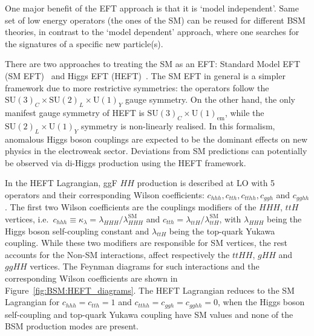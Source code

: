 One major benefit of the EFT approach is that it is `model independent'.
Same set of low energy operators (the ones of the SM) can be reused for different 
BSM theories, in contrast to the `model dependent' approach, 
where one searches for the signatures of a specific new particle(s). 

There are two approaches to treating the SM as an EFT:
Standard Model EFT (SM EFT)~\cite{EFT-dimension-6} and Higgs EFT (HEFT)~\cite{HEFT1, HEFT2}.
The SM EFT in general is a simpler framework due to more restrictive symmetries:
the operators follow the $\text{SU}(3)_C \times \text{SU}(2)_L\times \text{U}(1)_Y$ gauge symmetry.
On the other hand, the only manifest gauge symmetry of 
HEFT is $\text{SU}(3)_C \times \text{U}(1)_{\text{em}}$,
while the  $\text{SU}(2)_L\times \text{U}(1)_Y$ symmetry is non-linearly realised.
In this formalism, anomalous Higgs boson couplings are expected to be the 
dominant effects on new physics in the electroweak sector. 
Deviations from SM predictions can potentially be observed via 
di-Higgs production using the HEFT framework.

In the HEFT Lagrangian, ggF $HH$ production is described at LO with 
5 operators and their corresponding Wilson coefficients: $c_{hhh}, c_{tth}, c_{tthh}, c_{ggh}$ 
and $c_{gghh}$. 
The first two Wilson coefficients are the couplings modifiers 
of the $HHH$, $ttH$ vertices, 
i.e.\  $c_{hhh} \equiv \kappa_\lambda =  \lambda_{HHH} / \lambda^{\text{SM}}_{HHH}$ and 
$c_{tth}  = \lambda_{ttH} / \lambda^{\text{SM}}_{ttH}$,
with $\lambda_{HHH}$ being the Higgs boson self-coupling constant 
and $\lambda_{ttH}$ being the top-quark Yukawa coupling. 
While these two modifiers are responsible for SM vertices,
the rest accounts for the Non-SM interactions,
affect respectively the $ttHH$, $gHH$ and $ggHH$ vertices. 
The Feynman diagrams for such interactions and the corresponding
Wilson coefficients are shown in Figure~\ref{fig:BSM:HEFT_diagrams}.
The HEFT Lagrangian reduces to the SM Lagrangian for $c_{hhh} = c_{tth} = 1$ 
and $c_{tthh} = c_{ggh} = c_{gghh} = 0$, when the Higgs boson self-coupling 
and top-quark Yukawa coupling have SM values 
and none of the BSM production modes are present. 

